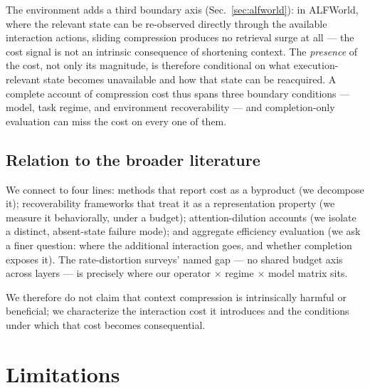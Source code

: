 \documentclass[11pt]{article}
\begin{document}
The environment adds a third boundary axis (Sec.~\ref{sec:alfworld}): in ALFWorld, where the relevant state
can be re-observed directly through the available interaction actions, sliding compression
produces no retrieval surge at all --- the cost signal is not an intrinsic consequence of
shortening context. The \emph{presence} of the cost, not only its magnitude, is therefore
conditional on what execution-relevant state becomes unavailable and how that state can be
reacquired. A complete account of compression cost thus spans three boundary conditions ---
model, task regime, and environment recoverability --- and completion-only evaluation can
miss the cost on every one of them.

\subsection{Relation to the broader literature}

We connect to four lines: methods that report cost as a byproduct (we decompose it);
recoverability frameworks that treat it as a representation property (we measure it
behaviorally, under a budget); attention-dilution accounts (we isolate a distinct,
absent-state failure mode); and aggregate efficiency evaluation (we ask a finer question:
where the additional interaction goes, and whether completion exposes it). The
rate-distortion surveys' named gap --- no shared budget axis across layers --- is precisely
where our operator $\times$ regime $\times$ model matrix sits.

We therefore do not claim that context compression is intrinsically harmful or
beneficial; we characterize the interaction cost it introduces and the conditions under
which that cost becomes consequential.

\section{Limitations}
\label{sec:limitations}
\end{document}
